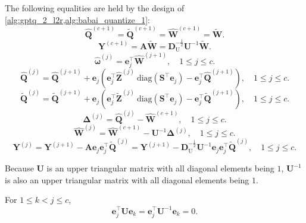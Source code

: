 \documentclass{article} %
\begin{document}
The following equalities are held by the design of \cref{alg:gptq_2_l2r,alg:babai_quantize_1}:
\begin{equation}
\hat{\bm{Q}}^{(c+1)} = \tilde{\bm{Q}}^{(c+1)} = \hat{\bm{W}}^{(c+1)} = \tilde{\bm{W}}.
\label{eq:p2_c_init}
\end{equation}
\begin{equation}
\bm{Y}^{(c+1)} = \bm{A} \tilde{\bm{W}} = \bm{D}_{\mathrm{U}}^{-\frac{1}{2}} \bm{U}^{-1} \tilde{\bm{W}} .
\label{eq:p2_c_y1}
\end{equation}
\begin{equation}
\hat{\bm{\omega}}^{(j)} = \mathbf{e}_{j}^\top \hat{\bm{W}}^{(j+1)}, \quad 1 \le j \le c .
\label{eq:p2_c_oh}
\end{equation}
\begin{equation}
\hat{\bm{Q}}^{(j)} = \hat{\bm{Q}}^{(j+1)} + \mathbf{e}_{j} \left( \mathbf{e}_{j}^\top \hat{\bm{Z}}^{(j)} \mathrm{\ diag} \left( \bm{S}^\top \mathbf{e}_{j} \right) - \mathbf{e}_{j}^\top \hat{\bm{Q}}^{(j+1)} \right), \quad 1 \le j \le c .
\label{eq:p2_c_qh}
\end{equation}
\begin{equation}
\tilde{\bm{Q}}^{(j)} = \tilde{\bm{Q}}^{(j+1)} + \mathbf{e}_{j} \left( \mathbf{e}_{j}^\top \tilde{\bm{Z}}^{(j)} \mathrm{\ diag} \left( \bm{S}^\top \mathbf{e}_{j} \right) - \mathbf{e}_{j}^\top \tilde{\bm{Q}}^{(j+1)} \right), \quad 1 \le j \le c .
\label{eq:p2_c_qt}
\end{equation}
\begin{equation}
\bm{\Delta}^{(j)} = \hat{\bm{Q}}^{(j)} - \hat{\bm{W}}^{(c+1)}, \quad 1 \le j \le c .
\label{eq:p2_c_d}
\end{equation}
\begin{equation}
\hat{\bm{W}}^{(j)} = \hat{\bm{W}}^{(c+1)} - \bm{U}^{-1} \bm{\Delta}^{(j)}, \quad 1 \le j \le c .
\label{eq:p2_c_wh}
\end{equation}
\begin{equation}
\bm{Y}^{(j)} = \bm{Y}^{(j+1)} - \bm{A} \mathbf{e}_{j} \mathbf{e}_{j}^\top \tilde{\bm{Q}}^{(j)} = \bm{Y}^{(j+1)} - \bm{D}_{\mathrm{U}}^{-\frac{1}{2}} \bm{U}^{-1} \mathbf{e}_{j} \mathbf{e}_{j}^\top \tilde{\bm{Q}}^{(j)}, \quad 1 \le j \le c .
\label{eq:p2_c_y}
\end{equation}

Because $\bm{U}$ is an upper triangular matrix with all diagonal elements being $1$, $\bm{U}^{-1}$ is also an upper triangular matrix with all diagonal elements being $1$.

For $1 \le k < j \le c$,
\begin{equation}
\mathbf{e}_{j}^\top \bm{U} \mathbf{e}_{k} = \mathbf{e}_{j}^\top \bm{U}^{-1} \mathbf{e}_{k} = 0 .
\label{eq:p2_eue0}
\end{equation}
\end{document}
